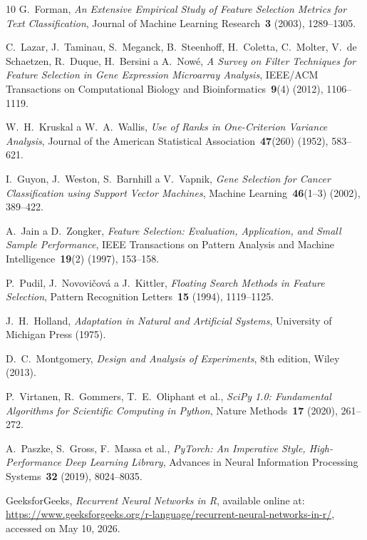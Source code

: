 \begin{thebibliography}{10}
G.~Forman, \textit{An Extensive Empirical Study of Feature Selection Metrics for Text Classification}, 
Journal of Machine Learning Research~\textbf{3} (2003), 1289--1305.

C.~Lazar, J.~Taminau, S.~Meganck, B.~Steenhoff, H.~Coletta, C.~Molter, 
V.~de Schaetzen, R.~Duque, H.~Bersini a A.~Nowé, 
\textit{A Survey on Filter Techniques for Feature Selection in Gene Expression Microarray Analysis}, 
IEEE/ACM Transactions on Computational Biology and Bioinformatics~\textbf{9}(4) (2012), 1106--1119.

W.~H.~Kruskal a W.~A.~Wallis, \textit{Use of Ranks in One-Criterion Variance Analysis}, 
Journal of the American Statistical Association~\textbf{47}(260) (1952), 583--621.

I.~Guyon, J.~Weston, S.~Barnhill a V.~Vapnik, 
\textit{Gene Selection for Cancer Classification using Support Vector Machines}, 
Machine Learning~\textbf{46}(1--3) (2002), 389--422.

A.~Jain a D.~Zongker, \textit{Feature Selection: Evaluation, Application, and Small Sample Performance}, 
IEEE Transactions on Pattern Analysis and Machine Intelligence~\textbf{19}(2) (1997), 153--158.

P.~Pudil, J.~Novovičová a J.~Kittler, \textit{Floating Search Methods in Feature Selection}, 
Pattern Recognition Letters~\textbf{15} (1994), 1119--1125.

J.~H.~Holland, \textit{Adaptation in Natural and Artificial Systems}, 
University of Michigan Press (1975).

D.~C.~Montgomery, \textit{Design and Analysis of Experiments}, 
8th edition, Wiley (2013).

P.~Virtanen, R.~Gommers, T.~E.~Oliphant et al., 
\textit{SciPy 1.0: Fundamental Algorithms for Scientific Computing in Python}, 
Nature Methods~\textbf{17} (2020), 261--272.

A.~Paszke, S.~Gross, F.~Massa et al., 
\textit{PyTorch: An Imperative Style, High-Performance Deep Learning Library}, 
Advances in Neural Information Processing Systems~\textbf{32} (2019), 8024--8035.

GeeksforGeeks, \textit{Recurrent Neural Networks in R}, 
available online at: \url{https://www.geeksforgeeks.org/r-language/recurrent-neural-networks-in-r/}, 
accessed on May 10, 2026.


\end{thebibliography}
